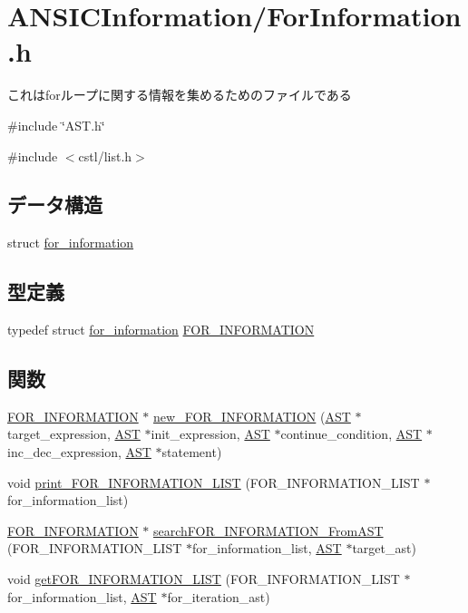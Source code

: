 \section{ANSICInformation/ForInformation.h}
\label{ForInformation_8h}


これはforループに関する情報を集めるためのファイルである  


{\ttfamily \#include \char`\"{}AST.h\char`\"{}}\par
{\ttfamily \#include $<$cstl/list.h$>$}\par
\subsection*{データ構造}
\begin{DoxyCompactItemize}
\item 
struct \hyperlink{structfor__information}{for\_\-information}
\end{DoxyCompactItemize}
\subsection*{型定義}
\begin{DoxyCompactItemize}
\item 
typedef struct \hyperlink{structfor__information}{for\_\-information} \hyperlink{ForInformation_8h_a2f30e4e2396ee1da23c3c282fbef2234}{FOR\_\-INFORMATION}
\end{DoxyCompactItemize}
\subsection*{関数}
\begin{DoxyCompactItemize}
\item 
\hyperlink{structfor__information}{FOR\_\-INFORMATION} $\ast$ \hyperlink{ForInformation_8h_a21a8cce7aba7cea3f56bbf3a6d84b14b}{new\_\-FOR\_\-INFORMATION} (\hyperlink{structabstract__syntax__tree}{AST} $\ast$target\_\-expression, \hyperlink{structabstract__syntax__tree}{AST} $\ast$init\_\-expression, \hyperlink{structabstract__syntax__tree}{AST} $\ast$continue\_\-condition, \hyperlink{structabstract__syntax__tree}{AST} $\ast$inc\_\-dec\_\-expression, \hyperlink{structabstract__syntax__tree}{AST} $\ast$statement)
\item 
void \hyperlink{ForInformation_8h_af3b7535a1754cb46702469bf0e1989b2}{print\_\-FOR\_\-INFORMATION\_\-LIST} (FOR\_\-INFORMATION\_\-LIST $\ast$for\_\-information\_\-list)
\item 
\hyperlink{structfor__information}{FOR\_\-INFORMATION} $\ast$ \hyperlink{ForInformation_8h_abd0a6a19cc86b9a0089eaca36dafaab2}{searchFOR\_\-INFORMATION\_\-FromAST} (FOR\_\-INFORMATION\_\-LIST $\ast$for\_\-information\_\-list, \hyperlink{structabstract__syntax__tree}{AST} $\ast$target\_\-ast)
\item 
void \hyperlink{ForInformation_8h_a2f25ff3d1088a97208582080fdae4d01}{getFOR\_\-INFORMATION\_\-LIST} (FOR\_\-INFORMATION\_\-LIST $\ast$for\_\-information\_\-list, \hyperlink{structabstract__syntax__tree}{AST} $\ast$for\_\-iteration\_\-ast)
\end{DoxyCompactItemize}


